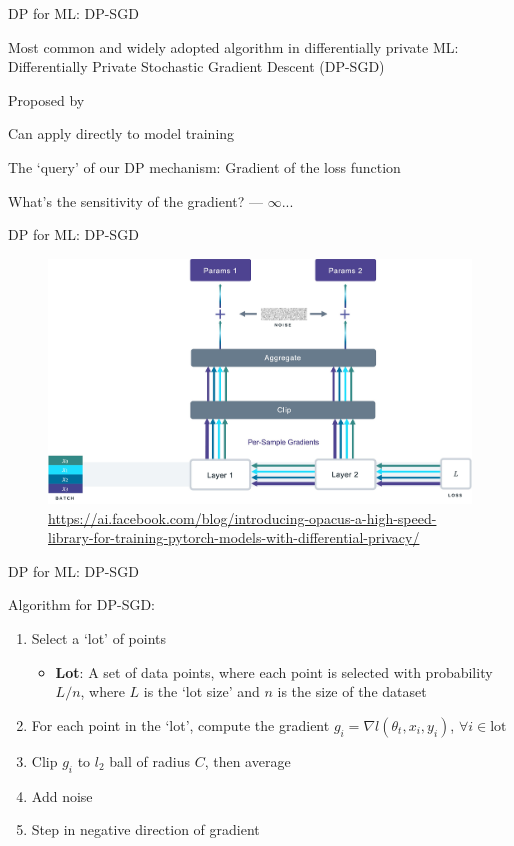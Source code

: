 \documentclass[12pt,aspectratio=169]{beamer}
\begin{document}
\begin{frame}{DP for ML: DP-SGD}

Most common and widely adopted algorithm in differentially private ML: Differentially Private Stochastic Gradient Descent (DP-SGD)

Proposed by \citet{Abadi.et.al.2016.SIGSAC}

Can apply directly to model training

The `query' of our DP mechanism: Gradient of the loss function

What's the sensitivity of the gradient? --- $\infty$...

\end{frame}


\begin{frame}{DP for ML: DP-SGD}

\begin{figure}
    \centering
    \includegraphics[width=0.8\linewidth]{figures/DP-SGD.jpg}
    \caption{\tiny \url{https://ai.facebook.com/blog/introducing-opacus-a-high-speed-library-for-training-pytorch-models-with-differential-privacy/}}
\end{figure}

\end{frame}


\begin{frame}{DP for ML: DP-SGD}

\begin{block}{Algorithm for DP-SGD:}
\begin{enumerate}
    \item Select a `lot' of points
    \begin{itemize}
        \item \textbf{Lot}: A set of data points, where each point is selected with probability $L/n$, where $L$ is the `lot size' and $n$ is the size of the dataset
    \end{itemize}
    \item For each point in the `lot', compute the gradient $g_i = \nabla l (\theta_t, x_i, y_i)$, $\forall i \in \text{lot}$
    \item Clip $g_i$ to $l_2$ ball of radius $C$, then average
    \item Add noise
    \item Step in negative direction of gradient
\end{enumerate}
\end{block}

\end{frame}
\end{document}
